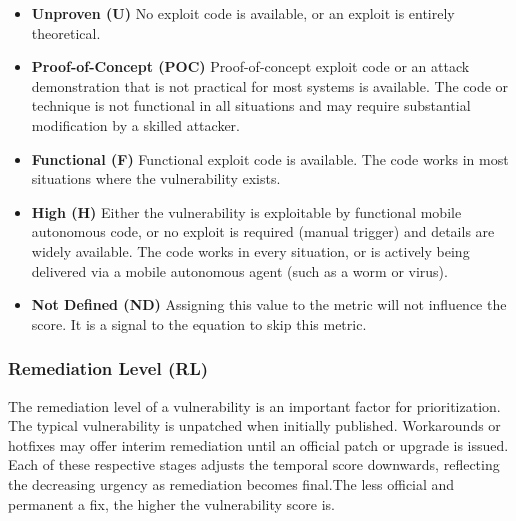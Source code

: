         \begin{itemize}
          \item
            \textbf{Unproven (U)} No exploit code is available, or an exploit is
            entirely theoretical.
          \item
            \textbf{Proof-of-Concept (POC)} Proof-of-concept exploit code or an
            attack demonstration that is not practical for most systems is
            available. The code or technique is not functional in all situations
            and may require substantial modification by a skilled attacker.
          \item
            \textbf{Functional (F)} Functional exploit code is available. The code
            works in most situations where the vulnerability exists.
          \item
            \textbf{High (H)} Either the vulnerability is exploitable by
            functional mobile autonomous code, or no exploit is required (manual
            trigger) and details are widely available. The code works in every
            situation, or is actively being delivered via a mobile autonomous
            agent (such as a worm or virus).
          \item
            \textbf{Not Defined (ND)} Assigning this value to the metric will not
            influence the score. It is a signal to the equation to skip this
            metric.
        \end{itemize}

      \subsubsection{Remediation Level (RL)}\label{subsubsec:remediation-level-rl}

        The remediation level of a vulnerability is an important factor for
        prioritization. The typical vulnerability is unpatched when initially
        published. Workarounds or hotfixes may offer interim remediation until
        an official patch or upgrade is issued. Each of these respective stages
        adjusts the temporal score downwards, reflecting the decreasing urgency
        as remediation becomes final.The less official and permanent a fix, the
        higher the vulnerability score is.

